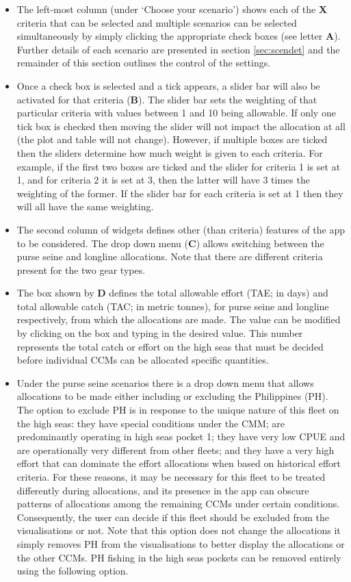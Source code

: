 \documentclass[11pt]{article}
\begin{document}
\begin{itemize}
\item The left-most column (under `Choose your scenario') shows each of the {\bf X} criteria that can be selected and multiple scenarios can be selected simultaneously by simply clicking the appropriate check boxes (see letter {\bf A}). Further details of each scenario are presented in section \ref{sec:scendet} and the remainder of this section outlines the control of the settings.
\item Once a check box is selected and a tick appears, a slider bar will also be activated for that criteria ({\bf B}). The slider bar sets the weighting of that particular criteria with values between 1 and 10 being allowable. If only one tick box is checked then moving the slider will not impact the allocation at all (the plot and table will not change). However, if multiple boxes are ticked then the sliders determine how much weight is given to each criteria. For example, if the first two boxes are ticked and the slider for criteria 1 is set at 1, and for criteria 2 it is set at 3, then the latter will have 3 times the weighting of the former. If the slider bar for each criteria is set at 1 then they will all have the same weighting.
\item The second column of widgets defines other (than criteria) features of the app to be considered. The drop down menu ({\bf C}) allows switching between the purse seine and longline allocations. Note that there are different criteria present for the two gear types.
\item The box shown by {\bf D} defines the total allowable effort (TAE; in days) and total allowable catch (TAC; in metric tonnes), for purse seine and longline respectively, from which the allocations are made. The value can be modified by clicking on the box and typing in the desired value. This number represents the total catch or effort on the high seas that must be decided before individual CCMs can be allocated specific quantities.
\item Under the purse seine scenarios there is a drop down menu that allows allocations to be made either including or excluding the Philippines (PH). The option to exclude PH is in response to the unique nature of this fleet on the high seas: they have special conditions under the CMM; are predominantly operating in high seas pocket 1; they have very low CPUE and are operationally very different from other fleets; and they have a very high effort that can dominate the effort allocations when based on historical effort criteria. For these reasons, it may be necessary for this fleet to be treated differently during allocations, and its presence in the app can obscure patterns of allocations among the remaining CCMs under certain conditions. Consequently, the user can decide if this fleet should be excluded from the visualisations or not. Note that this option does not change the allocations it simply removes PH from the visualisations to better display the allocations or the other CCMs. PH fishing in the high seas pockets can be removed entirely using the following option.

\end{itemize}
\end{document}

